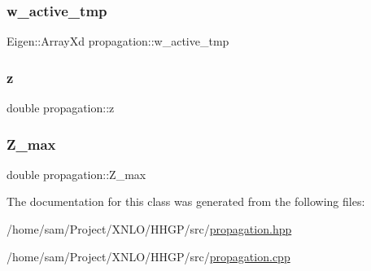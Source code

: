\subsubsection{\texorpdfstring{w\+\_\+active\+\_\+tmp}{w\_active\_tmp}}
{\footnotesize\ttfamily Eigen\+::\+Array\+Xd propagation\+::w\+\_\+active\+\_\+tmp\hspace{0.3cm}{\ttfamily [private]}}

\mbox{\label{classpropagation_aeacfc091fafd1fdb1af4536f6f587e55}} 
\subsubsection{\texorpdfstring{z}{z}}
{\footnotesize\ttfamily double propagation\+::z}

\mbox{\label{classpropagation_ae0b2d1a8fa0e59d37e124a0ba1f12dd2}} 
\subsubsection{\texorpdfstring{Z\+\_\+max}{Z\_max}}
{\footnotesize\ttfamily double propagation\+::\+Z\+\_\+max\hspace{0.3cm}{\ttfamily [private]}}



The documentation for this class was generated from the following files\+:\begin{DoxyCompactItemize}
\item 
/home/sam/\+Project/\+X\+N\+L\+O/\+H\+H\+G\+P/src/\hyperlink{propagation_8hpp}{propagation.\+hpp}\item 
/home/sam/\+Project/\+X\+N\+L\+O/\+H\+H\+G\+P/src/\hyperlink{propagation_8cpp}{propagation.\+cpp}\end{DoxyCompactItemize}

